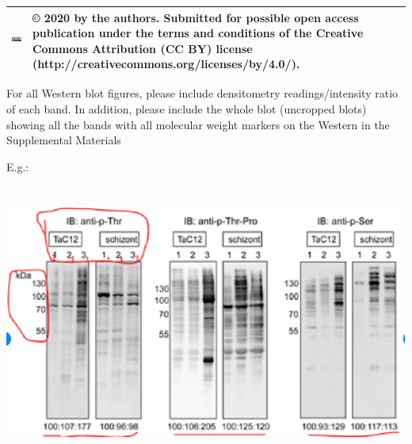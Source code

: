 \documentclass{article} %
\begin{document}
\begin{tabular}{|p{0.8in}|p{3.3in}|} \hline 
\includegraphics*[width=1.10in, height=0.40in, keepaspectratio=false]{image5} & {\copyright} 2020 by the authors. Submitted for possible open access publication under the terms and conditions of the Creative Commons Attribution (CC BY) license (http://creativecommons.org/licenses/by/4.0/). \\ \hline 
\end{tabular}



\noindent 

\noindent 

\noindent For all Western blot figures, please include densitometry readings/intensity ratio of each band. In addition, please include the whole blot (uncropped blots) showing all the bands with all molecular weight markers on the Western in the Supplemental Materials

\noindent E.g.: 

\noindent \includegraphics*[width=6.13in, height=3.56in, keepaspectratio=false]{image6}
\end{document}
